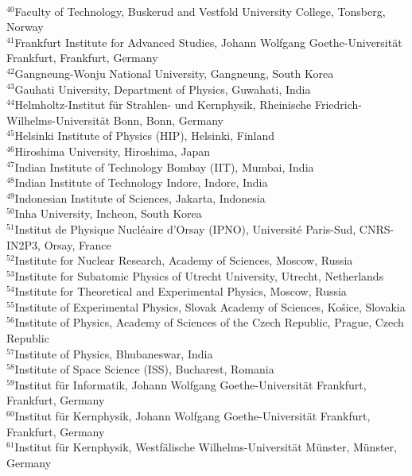 \begin{flushleft}
\\
$^{40}$Faculty of Technology, Buskerud and Vestfold University College, Tonsberg, Norway
\\
$^{41}$Frankfurt Institute for Advanced Studies, Johann Wolfgang Goethe-Universit\"{a}t Frankfurt, Frankfurt, Germany
\\
$^{42}$Gangneung-Wonju National University, Gangneung, South Korea
\\
$^{43}$Gauhati University, Department of Physics, Guwahati, India
\\
$^{44}$Helmholtz-Institut f\"{u}r Strahlen- und Kernphysik, Rheinische Friedrich-Wilhelms-Universit\"{a}t Bonn, Bonn, Germany
\\
$^{45}$Helsinki Institute of Physics (HIP), Helsinki, Finland
\\
$^{46}$Hiroshima University, Hiroshima, Japan
\\
$^{47}$Indian Institute of Technology Bombay (IIT), Mumbai, India
\\
$^{48}$Indian Institute of Technology Indore, Indore, India
\\
$^{49}$Indonesian Institute of Sciences, Jakarta, Indonesia
\\
$^{50}$Inha University, Incheon, South Korea
\\
$^{51}$Institut de Physique Nucl\'eaire d'Orsay (IPNO), Universit\'e Paris-Sud, CNRS-IN2P3, Orsay, France
\\
$^{52}$Institute for Nuclear Research, Academy of Sciences, Moscow, Russia
\\
$^{53}$Institute for Subatomic Physics of Utrecht University, Utrecht, Netherlands
\\
$^{54}$Institute for Theoretical and Experimental Physics, Moscow, Russia
\\
$^{55}$Institute of Experimental Physics, Slovak Academy of Sciences, Ko\v{s}ice, Slovakia
\\
$^{56}$Institute of Physics, Academy of Sciences of the Czech Republic, Prague, Czech Republic
\\
$^{57}$Institute of Physics, Bhubaneswar, India
\\
$^{58}$Institute of Space Science (ISS), Bucharest, Romania
\\
$^{59}$Institut f\"{u}r Informatik, Johann Wolfgang Goethe-Universit\"{a}t Frankfurt, Frankfurt, Germany
\\
$^{60}$Institut f\"{u}r Kernphysik, Johann Wolfgang Goethe-Universit\"{a}t Frankfurt, Frankfurt, Germany
\\
$^{61}$Institut f\"{u}r Kernphysik, Westf\"{a}lische Wilhelms-Universit\"{a}t M\"{u}nster, M\"{u}nster, Germany

\end{flushleft}
